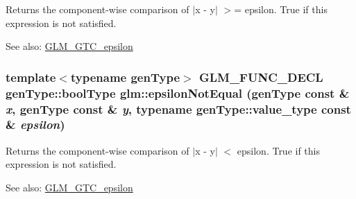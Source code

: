 Returns the component-wise comparison of $|$x - y$|$ $>$= epsilon. True if this expression is not satisfied.

\begin{Desc}
\item[See also:]\hyperlink{group__gtc__epsilon}{GLM\_\-GTC\_\-epsilon} \end{Desc}
\hypertarget{group__gtc__epsilon_g3958ccc0b5aa101c4b6eea41a2f2d51a}{
\subsubsection[epsilonNotEqual]{\setlength{\rightskip}{0pt plus 5cm}template$<$typename genType$>$ GLM\_\-FUNC\_\-DECL genType::boolType glm::epsilonNotEqual (genType const \& {\em x}, \/  genType const \& {\em y}, \/  typename genType::value\_\-type const \& {\em epsilon})}}
\label{group__gtc__epsilon_g3958ccc0b5aa101c4b6eea41a2f2d51a}


Returns the component-wise comparison of $|$x - y$|$ $<$ epsilon. True if this expression is not satisfied.

\begin{Desc}
\item[See also:]\hyperlink{group__gtc__epsilon}{GLM\_\-GTC\_\-epsilon} \end{Desc}
